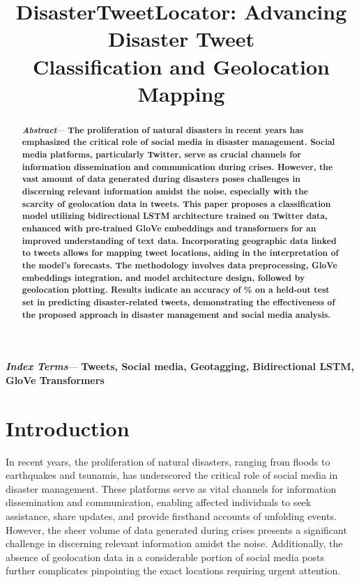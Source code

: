 \documentclass[conference]{IEEEtran}
\newcommand{\usingieee}{}
\newenvironment{IEEEkeywords}{\par\noindent\textit{\textbf{Index Terms}}---\bfseries}{\par}
\begin{document}
\title{DisasterTweetLocator: Advancing Disaster Tweet\\ Classification and Geolocation Mapping}


\date{}

\maketitle

\begin{abstract}
\ifdefined\usingieee\else\noindent\textbf{\textit{Abstract}}---\fi
\textbf{The proliferation of natural disasters in recent years has emphasized the critical role of social media in disaster management. Social media platforms, particularly Twitter, serve as crucial channels for information dissemination and communication during crises. However, the vast amount of data generated during disasters poses challenges in discerning relevant information amidst the noise, especially with the scarcity of geolocation data in tweets. This paper proposes a classification model utilizing bidirectional LSTM architecture trained on Twitter data, enhanced with pre-trained GloVe embeddings and transformers for an improved understanding of text data. Incorporating geographic data linked to tweets allows for mapping tweet locations, aiding in the interpretation of the model's forecasts. The methodology involves data preprocessing, GloVe embeddings integration, and model architecture design, followed by geolocation plotting. Results indicate an accuracy of \accBilstm\% on a held-out test set in predicting disaster-related tweets, demonstrating the effectiveness of the proposed approach in disaster management and social media analysis.}
\end{abstract}

\begin{IEEEkeywords}
Tweets, Social media, Geotagging, Bidirectional LSTM, GloVe Transformers
\end{IEEEkeywords}

\section{Introduction}
In recent years, the proliferation of natural disasters, ranging from floods to earthquakes and tsunamis, has underscored the critical role of social media in disaster management. These platforms serve as vital channels for information dissemination and communication, enabling affected individuals to seek assistance, share updates, and provide firsthand accounts of unfolding events. However, the sheer volume of data generated during crises presents a significant challenge in discerning relevant information amidst the noise. Additionally, the absence of geolocation data in a considerable portion of social media posts further complicates pinpointing the exact locations requiring urgent attention.
\end{document}
